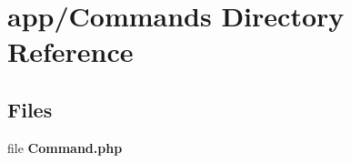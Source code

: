 \section{app/\+Commands Directory Reference}
\label{dir_5eb81d5d2a42a71b7f2c929d1622da14}
\subsection*{Files}
\begin{DoxyCompactItemize}
\item 
file {\bf Command.\+php}
\end{DoxyCompactItemize}
